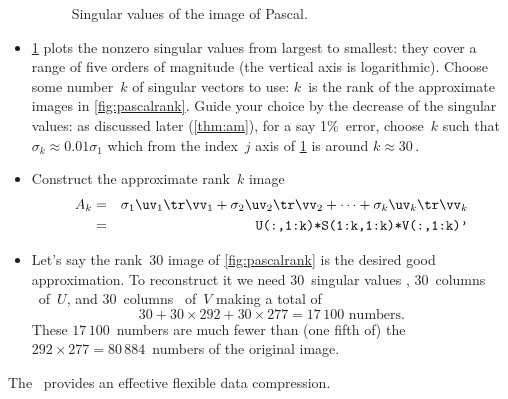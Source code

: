 \begin{example}
\begin{solution}
\begin{itemize}
\begin{figure}
\caption{Singular values of the image of Pascal.}
\label{fig:pascalsing}
\centering

\end{figure}
\item \cref{fig:pascalsing} plots the nonzero singular values from largest to smallest: they cover a range of five orders of magnitude (the vertical axis is logarithmic).
Choose some number~\(k\) of singular vectors to use: \(k\)~is the rank of the approximate images in \cref{fig:pascalrank}.
Guide your choice by the decrease of the singular values: as discussed later (\cref{thm:am}), for a say 1\%~error, choose~\(k\) such that \(\sigma_k\approx 0.01\sigma_1\) which from the index~\(j\) axis of \cref{fig:pascalsing} is around \(k\approx 30\)\,.

\item Construct the approximate rank~\(k\) image
\begin{eqnarray*}
A_k&=&\sigma_1\uv_1\tr\vv_1+\sigma_2\uv_2\tr\vv_2+\cdots+\sigma_k\uv_k\tr\vv_k
\\&=&\verb|U(:,1:k)*S(1:k,1:k)*V(:,1:k)'|
\end{eqnarray*}

\item Let's say the rank~\(30\) image of \cref{fig:pascalrank} is the desired good approximation.  
To reconstruct it we need \(30\)~singular values \hlist{}, \(30\)~columns \hlist{}\ of~\(U\), and \(30\)~columns \hlist{}\ of~\(V\) making a total of
\begin{equation*}
30+30\times292+30\times277=17\,100\text{ numbers}.
\end{equation*}
These \(17\,100\)~numbers are much fewer than (one fifth of) the \(292\times277=80\,884\)~numbers of the original image.
\end{itemize}
The \svd\ provides an effective flexible data compression.
\end{solution}
\end{example}











